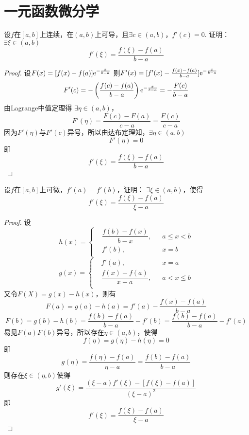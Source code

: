 \section{一元函数微分学}

\begin{proposition}
    
    设$f$在$[a,b]$上连续，在$(a,b)$上可导，且$\exists c\in (a,b)$，$f'(c)=0$.
    证明：$\exists \xi \in (a,b)$
    $$f'(\xi) = \dfrac{f(\xi)-f(a)}{b-a}$$

\end{proposition}

\begin{proof}
    
    设$F(x)= [f(x)-f(a)]\mathrm{e}^{-\frac{x}{b-a}}$
    则$F'(x)=[f'(x)-\frac{f(x)-f(a)}{b-a}]\mathrm{e}^{-\frac{x}{b-a}}$
    $$F'(c)= -\left(\dfrac{f(c)-f(a)}{b-a}\right)\mathrm{e}^{-\frac{x}{b-a}}=-\dfrac{F(c)}{b-a}$$
    由\textup{Lagrange}中值定理得
    $\exists \eta \in (a,b)$，
    $$F'(\eta) = \dfrac{F(c)-F(a)}{c-a} = \dfrac{F(c)}{c-a}$$
    因为$F'(\eta)$与$F'(c)$异号，所以由达布定理知，$\exists \eta \in (a,b)$
    $$F'(\eta) = 0$$
    即
    $$f'(\xi) = \dfrac{f(\xi)-f(a)}{b-a}$$

\end{proof}

\begin{theorem}[Flett中值定理]
    
    设$f$在$[a,b]$上可微，$f'(a)=f'(b)$，证明：
    $\exists \xi \in (a,b)$，使得
    $$f'(\xi) = \dfrac{f(\xi)-f(a)}{\xi - a}$$

\end{theorem}

\begin{proof}
    
    设$$h(x)=\left\{
        \begin{aligned}
            &\dfrac{f(b)-f(x)}{b-x}, &&a \leq x < b\\
            &f'(b), &&x = b\\
        \end{aligned}
    \right.
    $$
    $$g(x)=\left\{
        \begin{aligned}
            &f'(a), &&x = a\\
            &\dfrac{f(x)-f(a)}{x-a}, &&a < x \leq b\\
        \end{aligned}
    \right.
    $$
    又令$F(X)=g(x)-h(x)$，则有
    $$F(a) = g(a) - h(a) = f'(a) - \dfrac{f(x)-f(a)}{b-a}$$
    $$F(b) = g(b) - h(b) = \dfrac{f(b) - f(a)}{b-a}  - f'(b) = \dfrac{f(b) - f(a)}{b-a} - f'(a)$$
    易见$F(a)F(b)$异号，所以存在$\eta \in (a,b)$，使得
    $$ f(\eta) = g(\eta) -h(\eta) = 0$$
    即
    $$g(\eta) = \dfrac{f(\eta) - f(a)}{\eta - a }= \dfrac{f(b) - f(a)}{b-a}$$
    则存在$\xi \in (\eta,b)$使得
    $$g'(\xi) = \dfrac{(\xi -a )f'(\xi)-[f(\xi) - f(a)]}{(\xi - a)^2}$$
    即
    $$f'(\xi) = \dfrac{f(\xi)-f(a)}{\xi - a}$$

\end{proof}

